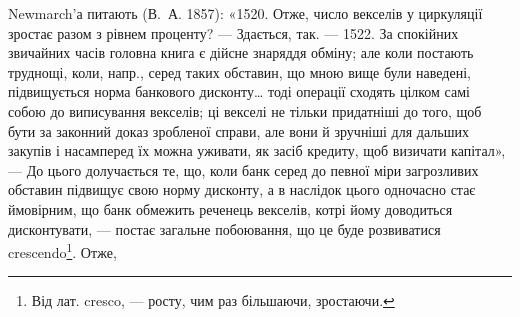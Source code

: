 Newmarch’а питають (В.~А. 1857): «1520. Отже, число векселів у циркуляції
зростає разом з рівнем проценту? — Здається, так. — 1522. За спокійних
звичайних часів головна книга є дійсне знаряддя обміну; але коли постають
труднощі, коли, напр., серед таких обставин, що мною вище були наведені, підвищується
норма банкового дисконту\dots{} тоді операції сходять цілком самі собою
до виписування векселів; ці векселі не тільки придатніші до того, щоб бути за
законний доказ зробленої справи, але вони й зручніші для дальших закупів
і насамперед їх можна уживати, як засіб кредиту, щоб визичати капітал», —
До цього долучається те, що, коли банк серед до певної міри загрозливих обставин
підвищує свою норму дисконту, а в наслідок цього одночасно стає ймовірним,
що банк обмежить реченець векселів, котрі йому доводиться дисконтувати,
— постає загальне побоювання, що це буде розвиватися crescendo\footnote{
Від лат. cresco, — росту, чим раз більшаючи, зростаючи. 
}. Отже,
\parbreak{}  %

